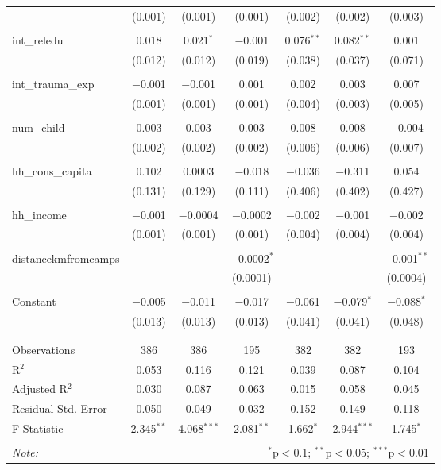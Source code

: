 \begin{table}[H]
\begin{tabular}{@{\extracolsep{4pt}}lcccccc}
  & (0.001) & (0.001) & (0.001) & (0.002) & (0.002) & (0.003) \\ 
  & & & & & & \\ 
 int\_reledu & 0.018 & 0.021$^{*}$ & $-$0.001 & 0.076$^{**}$ & 0.082$^{**}$ & 0.001 \\ 
  & (0.012) & (0.012) & (0.019) & (0.038) & (0.037) & (0.071) \\ 
  & & & & & & \\ 
 int\_trauma\_exp & $-$0.001 & $-$0.001 & 0.001 & 0.002 & 0.003 & 0.007 \\ 
  & (0.001) & (0.001) & (0.001) & (0.004) & (0.003) & (0.005) \\ 
  & & & & & & \\ 
 num\_child & 0.003 & 0.003 & 0.003 & 0.008 & 0.008 & $-$0.004 \\ 
  & (0.002) & (0.002) & (0.002) & (0.006) & (0.006) & (0.007) \\ 
  & & & & & & \\ 
 hh\_cons\_capita & 0.102 & 0.0003 & $-$0.018 & $-$0.036 & $-$0.311 & 0.054 \\ 
  & (0.131) & (0.129) & (0.111) & (0.406) & (0.402) & (0.427) \\ 
  & & & & & & \\ 
 hh\_income & $-$0.001 & $-$0.0004 & $-$0.0002 & $-$0.002 & $-$0.001 & $-$0.002 \\ 
  & (0.001) & (0.001) & (0.001) & (0.004) & (0.004) & (0.004) \\ 
  & & & & & & \\ 
 distancekmfromcamps &  &  & $-$0.0002$^{*}$ &  &  & $-$0.001$^{**}$ \\ 
  &  &  & (0.0001) &  &  & (0.0004) \\ 
  & & & & & & \\ 
 Constant & $-$0.005 & $-$0.011 & $-$0.017 & $-$0.061 & $-$0.079$^{*}$ & $-$0.088$^{*}$ \\ 
  & (0.013) & (0.013) & (0.013) & (0.041) & (0.041) & (0.048) \\ 
  & & & & & & \\ 
\hline \\[-1.8ex] 
Observations & 386 & 386 & 195 & 382 & 382 & 193 \\ 
R$^{2}$ & 0.053 & 0.116 & 0.121 & 0.039 & 0.087 & 0.104 \\ 
Adjusted R$^{2}$ & 0.030 & 0.087 & 0.063 & 0.015 & 0.058 & 0.045 \\ 
Residual Std. Error & 0.050 & 0.049 & 0.032 & 0.152 & 0.149 & 0.118 \\ 
F Statistic & 2.345$^{**}$ & 4.068$^{***}$ & 2.081$^{**}$ & 1.662$^{*}$ & 2.944$^{***}$ & 1.745$^{*}$ \\ 
\hline 
\hline \\[-1.8ex] 
\textit{Note:}  & \multicolumn{6}{r}{$^{*}$p$<$0.1; $^{**}$p$<$0.05; $^{***}$p$<$0.01} \\ 
\end{tabular} 
\end{table} 
